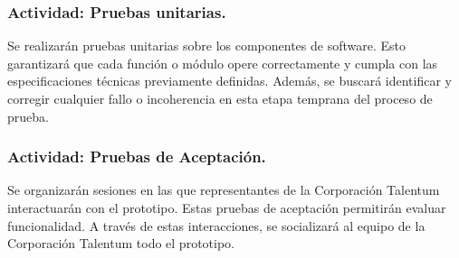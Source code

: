 \subsubsection{Actividad: Pruebas unitarias.}
Se realizarán pruebas unitarias sobre los componentes de software. Esto garantizará que cada función o módulo opere correctamente y cumpla con las especificaciones técnicas previamente definidas. Además, se buscará identificar y corregir cualquier fallo o incoherencia en esta etapa temprana del proceso de prueba.

\subsubsection{Actividad: Pruebas de Aceptación.}
Se organizarán sesiones en las que representantes de la Corporación Talentum interactuarán con el prototipo. Estas pruebas de aceptación permitirán evaluar funcionalidad. A través de estas interacciones, se socializará al equipo de la Corporación Talentum todo el prototipo.










